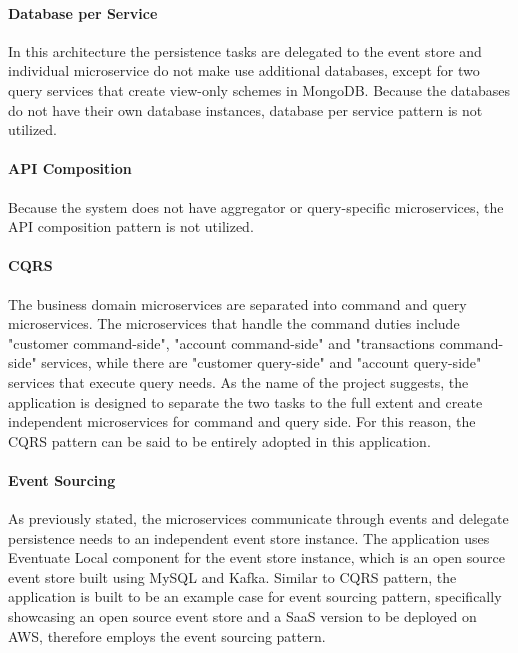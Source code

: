 \documentclass{Configuration_Files/PoliMi3i_thesis}
\begin{document}
\paragraph{Database per Service} In this architecture the persistence tasks are delegated to the event store and individual microservice do not make use additional databases, except for two query services that create view-only schemes in MongoDB.
Because the databases do not have their own database instances, database per service pattern is not utilized.

\paragraph{API Composition} Because the system does not have aggregator or query-specific microservices, the API composition pattern is not utilized.

\paragraph{CQRS} The business domain microservices are separated into command and query microservices.
The microservices that handle the command duties include "customer command-side", "account command-side" and "transactions command-side" services, while there are "customer query-side" and "account query-side" services that execute query needs.
As the name of the project suggests, the application is designed to separate the two tasks to the full extent and create independent microservices for command and query side.
For this reason, the CQRS pattern can be said to be entirely adopted in this application.

\paragraph{Event Sourcing} As previously stated, the microservices communicate through events and delegate persistence needs to an independent event store instance.
The application uses Eventuate Local\footnotemark[84] component for the event store instance, which is an open source event store built using MySQL and Kafka.
Similar to CQRS pattern, the application is built to be an example case for event sourcing pattern, specifically showcasing an open source event store and a SaaS version to be deployed on AWS, therefore employs the event sourcing pattern.
\end{document}
